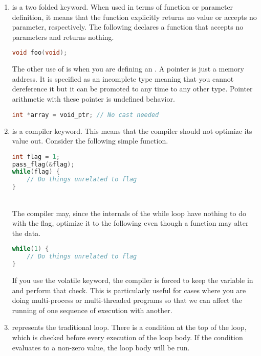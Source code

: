 \begin{enumerate}
	    \item {} is a two folded keyword.
        When used in terms of function or parameter definition, it means that the function explicitly returns no value or accepts no parameter, respectively. The following declares a function that accepts no parameters and returns nothing.

	      \begin{lstlisting}[language=C]
void foo(void);
\end{lstlisting}


	      The other use of  is when you are defining an .
        A  pointer is just a memory address. It is specified as an incomplete type meaning that you cannot dereference it but it can be promoted to any time to any other type. Pointer arithmetic with these pointer is undefined behavior.

	      \begin{lstlisting}[language=C]
int *array = void_ptr; // No cast needed
\end{lstlisting}

	    \item {} is a compiler keyword.
        This means that the compiler should not optimize its value out.
        Consider the following simple function.
	      \\
	      \begin{lstlisting}[language=C]
int flag = 1;
pass_flag(&flag);
while(flag) {
    // Do things unrelated to flag
}
\end{lstlisting}
	      \\
	      The compiler may, since the internals of the while loop have nothing to do with the flag, optimize it to the following even though a function may alter the data.
	      \\
	      \begin{lstlisting}[language=C]
while(1) {
    // Do things unrelated to flag
}
\end{lstlisting}
	      If you use the volatile keyword, the compiler is forced to keep the variable in and perform that check. This is particularly useful for cases where you are doing multi-process or multi-threaded programs so that we can affect the running of one sequence of execution with another.
	\item {} represents the traditional  loop. There is a condition at the top of the loop, which is checked before every execution of the loop body. If the condition evaluates to a non-zero value, the loop body will be run.
\end{enumerate}

